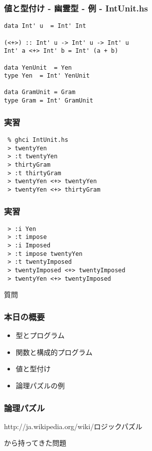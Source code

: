 \documentclass[cjk,dvipdfm,14pt]{beamer}
\begin{document}
\begin{frame}[fragile]
\frametitle{値と型付け - 幽霊型 - 例 - IntUnit.hs}

\begin{lstlisting}
data Int' u  = Int' Int

(<+>) :: Int' u -> Int' u -> Int' u
Int' a <+> Int' b = Int' (a + b)

data YenUnit  = Yen
type Yen  = Int' YenUnit

data GramUnit = Gram
type Gram = Int' GramUnit
\end{lstlisting}

\end{frame}

\begin{frame}[fragile]
\frametitle{実習}

\begin{lstlisting}
 % ghci IntUnit.hs
 > twentyYen
 > :t twentyYen
 > thirtyGram
 > :t thirtyGram
 > twentyYen <+> twentyYen
 > twentyYen <+> thirtyGram
\end{lstlisting}

\end{frame}

\begin{frame}[fragile]
\frametitle{実習}

\begin{lstlisting}
 > :i Yen
 > :t impose
 > :i Imposed
 > :t impose twentyYen
 > :t twentyImposed
 > twentyImposed <+> twentyImposed
 > twentyYen <+> twentyImposed
\end{lstlisting}

\end{frame}

\begin{frame}[fragile]
質問
\end{frame}

\begin{frame}[fragile]
\frametitle{本日の概要}

\begin{itemize}
\item 型とプログラム
\item 関数と構成的プログラム
\item 値と型付け
\item { \color{red} 論理パズルの例 }
\end{itemize}

\end{frame}

\begin{frame}[fragile]
\frametitle{論理パズル}

http://ja.wikipedia.org/wiki/ロジックパズル

から持ってきた問題

\end{frame}
\end{document}
